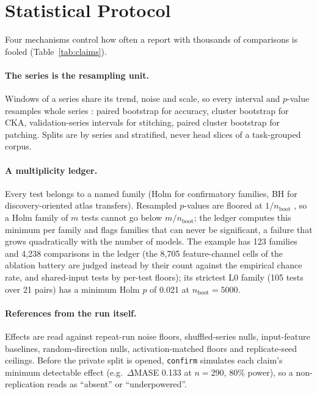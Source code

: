 \section{Statistical Protocol}
\label{sec:statistics}

Four mechanisms control how often a report with thousands of comparisons is fooled (Table~\ref{tab:claims}).

\paragraph{The series is the resampling unit.} Windows of a series share its trend, noise and scale, so every
interval and $p$-value resamples whole series \citep{efron1993bootstrap,cameron2008cluster}: paired bootstrap
for accuracy, cluster bootstrap for CKA, validation-series intervals for stitching, paired cluster bootstrap for
patching. Splits are by series and stratified, never head slices of a task-grouped corpus.

\paragraph{A multiplicity ledger.} Every test belongs to a named family (Holm for confirmatory families, BH for
discovery-oriented atlas transfers). Resampled $p$-values are floored at $1/n_{\text{boot}}$
\citep{phipson2010permutation}, so a Holm family of $m$ tests cannot go below $m/n_{\text{boot}}$; the ledger
computes this minimum per family and flags families that can never be significant, a failure that grows
quadratically with the number of models. The example has 123 families and 4{,}238 comparisons in the ledger (the
8{,}705 feature-channel cells of the ablation battery are judged instead by their count against the empirical chance
rate, and shared-input tests by per-test floors); its strictest L0
family (105 tests over 21 pairs) has a minimum Holm $p$ of 0.021 at $n_{\text{boot}}=5000$.

\paragraph{References from the run itself.} Effects are read against repeat-run noise floors, shuffled-series
nulls, input-feature baselines, random-direction nulls, activation-matched floors and replicate-seed ceilings.
Before the private split is opened, \texttt{confirm} simulates each claim's minimum detectable effect (e.g.\
$\Delta$MASE 0.133 at $n=290$, 80\% power), so a non-replication reads as ``absent'' or ``underpowered''.


